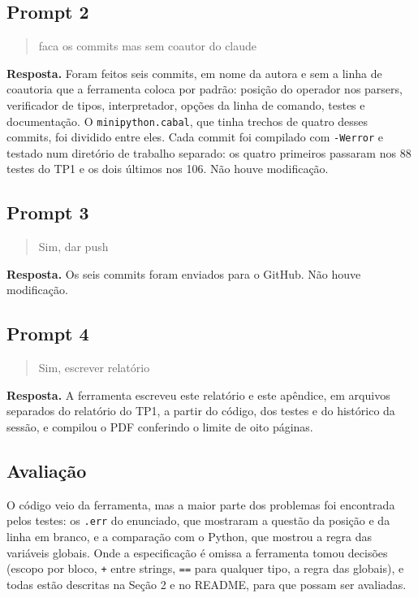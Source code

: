 \subsection*{Prompt 2}

\begin{quote}
faca os commits mas sem coautor do claude
\end{quote}

\textbf{Resposta.} Foram feitos seis commits, em nome da autora e sem a
linha de coautoria que a ferramenta coloca por padrão: posição do
operador nos parsers, verificador de tipos, interpretador, opções da
linha de comando, testes e documentação. O \texttt{minipython.cabal},
que tinha trechos de quatro desses commits, foi dividido entre eles.
Cada commit foi compilado com \texttt{-Werror} e testado num diretório
de trabalho separado: os quatro primeiros passaram nos 88 testes do
TP1 e os dois últimos nos 106. Não houve modificação.

\subsection*{Prompt 3}

\begin{quote}
Sim, dar push
\end{quote}

\textbf{Resposta.} Os seis commits foram enviados para o GitHub. Não
houve modificação.

\subsection*{Prompt 4}

\begin{quote}
Sim, escrever relatório
\end{quote}

\textbf{Resposta.} A ferramenta escreveu este relatório e este
apêndice, em arquivos separados do relatório do TP1, a partir do
código, dos testes e do histórico da sessão, e compilou o PDF
conferindo o limite de oito páginas.

\subsection*{Avaliação}

O código veio da ferramenta, mas a maior parte dos problemas foi
encontrada pelos testes: os \texttt{.err} do enunciado, que mostraram a
questão da posição e da linha em branco, e a comparação com o Python,
que mostrou a regra das variáveis globais. Onde a especificação é
omissa a ferramenta tomou decisões (escopo por bloco, \texttt{+} entre
strings, \texttt{==} para qualquer tipo, a regra das globais), e todas
estão descritas na Seção 2 e no README, para que possam ser avaliadas.
